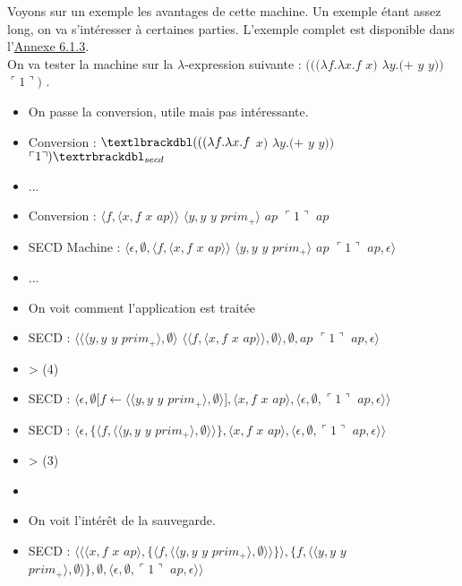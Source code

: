 \documentclass[10pt,a4paper]{article}
\begin{document}
				Voyons sur un exemple les avantages de cette machine. Un exemple étant assez long, on va s'intéresser à certaines parties. L'exemple complet est disponible dans l'\hyperref[SECD]{Annexe 6.1.3}. 
				\\
				On va tester la machine sur la $\lambda$-expression suivante : $(((\lambda f.\lambda x.f$ $x)$ $\lambda y.(+$ $y$ $y))$ $\ulcorner 1\urcorner)$ .
				\bigbreak
				
				\begin{itemize}
					\item[] On passe la conversion, utile mais pas intéressante.
					\item[] Conversion : $\textlbrackdbl(((\lambda f.\lambda x.f$ $x)$ $\lambda y.(+$ $y$ $y))$ $\ulcorner 1\urcorner)\textrbrackdbl_{secd}$
					\item[] ...
					\item[] Conversion : $\langle f,\langle x,f$ $x$ $ap\rangle\rangle$ $\langle y,y$ $y$ $prim_{+}\rangle$ $ap$ $\ulcorner 1\urcorner$ $ap$
					\item[] SECD Machine : $\langle\epsilon,\emptyset,\langle f,\langle x,f$ $x$ $ap\rangle\rangle$ $\langle y,y$ $y$ $prim_{+}\rangle$ $ap$ $\ulcorner 1\urcorner$ $ap,\epsilon\rangle$ 
					\item[] ...
					\item[] On voit comment l'application est traitée
					\item[] SECD : $\langle\langle\langle y,y$ $y$ $prim_{+}\rangle,\emptyset\rangle$ $\langle\langle f,\langle x,f$ $x$ $ap\rangle\rangle,\emptyset\rangle,\emptyset,ap$ $\ulcorner 1\urcorner$ $ap,\epsilon\rangle$
					\item[] > (4)
					\item[] SECD : $\langle\epsilon,\emptyset[f \leftarrow \langle\langle y,y$ $y$ $prim_{+}\rangle,\emptyset\rangle],\langle x,f$ $x$ $ap\rangle,\langle\epsilon,\emptyset,\ulcorner 1\urcorner$ $ap,\epsilon\rangle\rangle$
					\item[] SECD : $\langle\epsilon,\{\langle f,\langle\langle y,y$ $y$ $prim_{+}\rangle,\emptyset\rangle\rangle\},\langle x,f$ $x$ $ap\rangle,\langle\epsilon,\emptyset,\ulcorner 1\urcorner$ $ap,\epsilon\rangle\rangle$
					\item[] >  (3)
					\item[] 
					\item[] On voit l'intérêt de la sauvegarde.
					\item[] SECD : $\langle\langle\langle x,f$ $x$ $ap\rangle,\{\langle f,\langle\langle y,y$ $y$ $prim_{+}\rangle,\emptyset\rangle\rangle\}\rangle,\{f,\langle\langle y,y$ $y$ $prim_{+}\rangle,\emptyset\rangle\},\emptyset,\langle\epsilon,\emptyset,\ulcorner 1\urcorner$ $ap,\epsilon\rangle\rangle$

\end{itemize}
\end{document}
